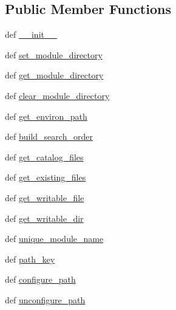 \subsection*{Public Member Functions}
\begin{DoxyCompactItemize}
\item 
def \hyperlink{classscipy_1_1weave_1_1catalog_1_1catalog_a7e6eaac72a04fee02e0267c0b34e47f8}{\+\_\+\+\_\+init\+\_\+\+\_\+}
\item 
def \hyperlink{classscipy_1_1weave_1_1catalog_1_1catalog_a462454a658cf8538454299ae9fe2cd46}{set\+\_\+module\+\_\+directory}
\item 
def \hyperlink{classscipy_1_1weave_1_1catalog_1_1catalog_ab04dc178df552c6184bcfa8f6d995bc9}{get\+\_\+module\+\_\+directory}
\item 
def \hyperlink{classscipy_1_1weave_1_1catalog_1_1catalog_af1b3e01d15b0f559511ff2be796bc739}{clear\+\_\+module\+\_\+directory}
\item 
def \hyperlink{classscipy_1_1weave_1_1catalog_1_1catalog_ac9a2b4f2af953637c9098b862d073eb9}{get\+\_\+environ\+\_\+path}
\item 
def \hyperlink{classscipy_1_1weave_1_1catalog_1_1catalog_a95dac22efc5779533299308fc1732d8d}{build\+\_\+search\+\_\+order}
\item 
def \hyperlink{classscipy_1_1weave_1_1catalog_1_1catalog_ad4d8b11abb17d6c24fee0ce128533390}{get\+\_\+catalog\+\_\+files}
\item 
def \hyperlink{classscipy_1_1weave_1_1catalog_1_1catalog_a41704f1857a3225c5659611a78153384}{get\+\_\+existing\+\_\+files}
\item 
def \hyperlink{classscipy_1_1weave_1_1catalog_1_1catalog_aa1b99eff8b1e45f58ed940e334ed9c06}{get\+\_\+writable\+\_\+file}
\item 
def \hyperlink{classscipy_1_1weave_1_1catalog_1_1catalog_acab130b8eba04c505736416d85545a6f}{get\+\_\+writable\+\_\+dir}
\item 
def \hyperlink{classscipy_1_1weave_1_1catalog_1_1catalog_aee5408f03bb505b9778ad2c9d3bf4b69}{unique\+\_\+module\+\_\+name}
\item 
def \hyperlink{classscipy_1_1weave_1_1catalog_1_1catalog_a9575f495349f70602b6e8a61bef2265c}{path\+\_\+key}
\item 
def \hyperlink{classscipy_1_1weave_1_1catalog_1_1catalog_a704165141edfcd4d5fb8e900fbf04941}{configure\+\_\+path}
\item 
def \hyperlink{classscipy_1_1weave_1_1catalog_1_1catalog_a41efa0adb0ddf31de23b7163f31d0f7a}{unconfigure\+\_\+path}

\end{DoxyCompactItemize}
